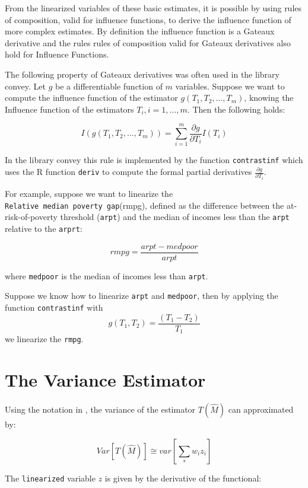 \documentclass[
]{book}
\begin{document}
From the linearized variables of these basic estimates, it is possible by using rules of composition, valid for influence functions, to derive the influence function of more complex estimates. By definition the influence function is a Gateaux derivative and the rules rules of composition valid for Gateaux derivatives also hold for Influence Functions.

The following property of Gateaux derivatives was often used in the library convey. Let \(g\) be a differentiable function of \(m\) variables. Suppose we want to compute the influence function of the estimator \(g(T_1, T_2,\ldots, T_m)\), knowing the Influence function of the estimators \(T_i, i=1,\ldots, m\). Then the following holds:

\[
I(g(T_1, T_2,\ldots, T_m)) = \sum_{i=1}^m \frac{\partial g}{\partial T_i}I(T_i)
\]

In the library convey this rule is implemented by the function \texttt{contrastinf} which uses the R function \texttt{deriv} to compute the formal partial derivatives \(\frac{\partial g}{\partial T_i}\).

For example, suppose we want to linearize the \texttt{Relative\ median\ poverty\ gap}(rmpg), defined as the difference between the at-risk-of-poverty threshold (\texttt{arpt}) and the median of incomes less than the \texttt{arpt} relative to the \texttt{arprt}:

\[
rmpg= \frac{arpt-medpoor} {arpt}
\]

where \texttt{medpoor} is the median of incomes less than \texttt{arpt}.

Suppose we know how to linearize \texttt{arpt} and \texttt{medpoor}, then by applying the function \texttt{contrastinf} with
\[
g(T_1,T_2)= \frac{(T_1 - T_2)}{T_1}
\]
we linearize the \texttt{rmpg}.

\hypertarget{the-variance-estimator}{%
\section{The Variance Estimator}\label{the-variance-estimator}}

Using the notation in \textcite{osier2009}, the variance of the estimator \(T(\hat{M})\) can approximated by:

\begin{equation}
Var\left[T(\hat{M})\right]\cong var\left[\sum_s w_i z_i\right]
\label{eq:var}
\end{equation}

The \texttt{linearized} variable \(z\) is given by the derivative of the functional:
\end{document}
